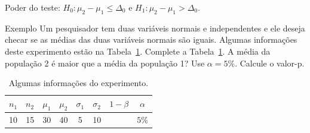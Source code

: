 \documentclass[9pt]{beamer}
\begin{document}
\begin{frame}{Poder do teste: $H_0: \mu_2 - \mu_1 \leq \Delta_0$ e $H_1: \mu_2 - \mu_1 > \Delta_0.$}

\begin{block}{Exemplo}
	Um pesquisador tem duas variáveis normais e independentes e ele deseja checar se as médias das duas variáveis normais são iguais. Algumas informações deste experimento estão na Tabela~\ref{tab:experimento-h1-upper-power}. Complete a Tabela~\ref{tab:experimento-h1-upper-power}. A média da população 2 é maior que a média da população 1? Use $\alpha=5\%$. Calcule o valor-p.
\end{block}

\begin{table}[htbp]
	\centering
	\begin{tabular}{c|c|c|c|c|c|c|c}
		\toprule[0.05cm]
		$n_1$ & $n_2$ & $\mu_1$ & $\mu_2$ & $\sigma_1$ & $\sigma_2$ & $1-\beta$ & $\alpha$ \\ \midrule[0.025cm]
		 10 & 15 & 30 & 40 & 5  & 10 & & $5\%$ \\
		 \bottomrule[0.05cm]
	\end{tabular}
	\caption{Algumas informações do experimento.}
	\label{tab:experimento-h1-upper-power}
\end{table}
\end{frame}
\end{document}
